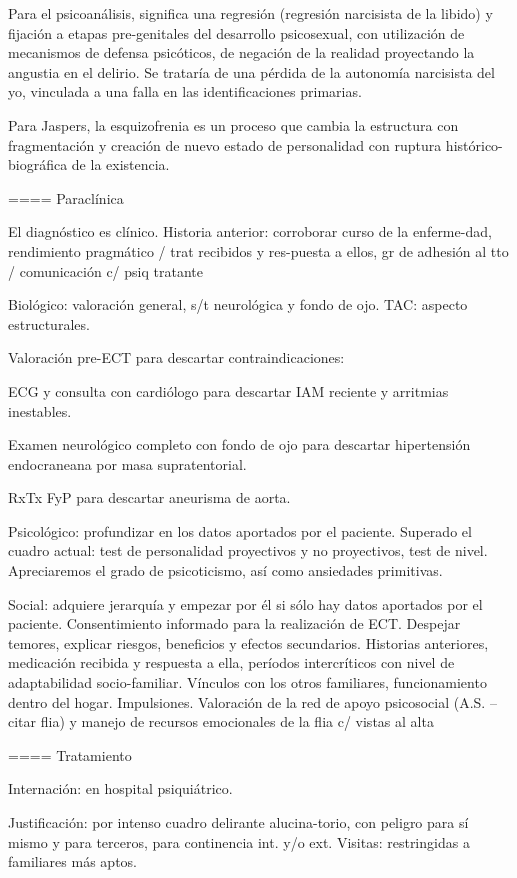 \documentclass[encares.tex]{subfiles}
\begin{document}
Para el psicoanálisis, significa una regresión (regresión narcisista de la libido) y fijación a etapas pre-genitales del desarrollo psicosexual, con utilización de mecanismos de defensa psicóticos, de negación de la realidad proyectando la angustia en el delirio. Se trataría de una pérdida de la autonomía narcisista del yo, vinculada a una falla en las identificaciones primarias.

Para Jaspers, la esquizofrenia es un proceso que cambia la estructura con fragmentación y creación de nuevo estado de personalidad con ruptura histórico-biográfica de la existencia.

==== Paraclínica

El diagnóstico es clínico. Historia anterior: corroborar curso de la enferme-dad, rendimiento pragmático / trat recibidos y res-puesta a ellos, gr de adhesión al tto / comunicación c/ psiq tratante

Biológico: valoración general, s/t neurológica y fondo de ojo. TAC: aspecto estructurales.

Valoración pre-ECT para descartar contraindicaciones:

ECG y consulta con cardiólogo para descartar IAM reciente y arritmias inestables.

Examen neurológico completo con fondo de ojo para descartar hipertensión endocraneana por masa supratentorial.

RxTx FyP para descartar aneurisma de aorta.

Psicológico: profundizar en los datos aportados por el paciente. Superado el cuadro actual: test de personalidad proyectivos y no proyectivos, test de nivel. Apreciaremos el grado de psicoticismo, así como ansiedades primitivas.

Social: adquiere jerarquía y empezar por él si sólo hay datos aportados por el paciente. Consentimiento informado para la realización de ECT. Despejar temores, explicar riesgos, beneficios y efectos secundarios. Historias anteriores, medicación recibida y respuesta a ella, períodos intercríticos con nivel de adaptabilidad socio-familiar. Vínculos con los otros familiares, funcionamiento dentro del hogar. Impulsiones. Valoración de la red de apoyo psicosocial (A.S. – citar flia) y manejo de recursos emocionales de la flia c/ vistas al alta

==== Tratamiento

Internación: en hospital psiquiátrico.

Justificación: por intenso cuadro delirante alucina-torio, con peligro para sí mismo y para terceros, para continencia int. y/o ext. Visitas: restringidas a familiares más aptos.
\end{document}
